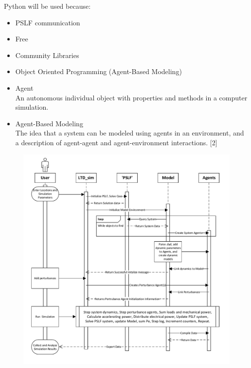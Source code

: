 \documentclass[14pt, unknownkeysallowed]{beamer}
\begin{document}
\begin{frame}
Python will be used because:
\begin{itemize}
	\item PSLF communication
	\item Free
	\item Community Libraries
	\item Object Oriented Programming (Agent-Based Modeling)
\end{itemize}
\end{frame}
\begin{frame}
\begin{itemize}
	\item Agent\\ An autonomous individual object with properties and methods in a computer simulation.
	\item Agent-Based Modeling\\ The idea that a system can be modeled using agents in an environment, and a description of agent-agent and agent-environment interactions. \tiny[2]
\end{itemize}
\end{frame}
\begin{frame}
\vspace{-.75em}
\begin{figure}
	\includegraphics[height=1.07\textheight]{systemInit01.pdf}
\end{figure}
\end{frame}
\end{document}
